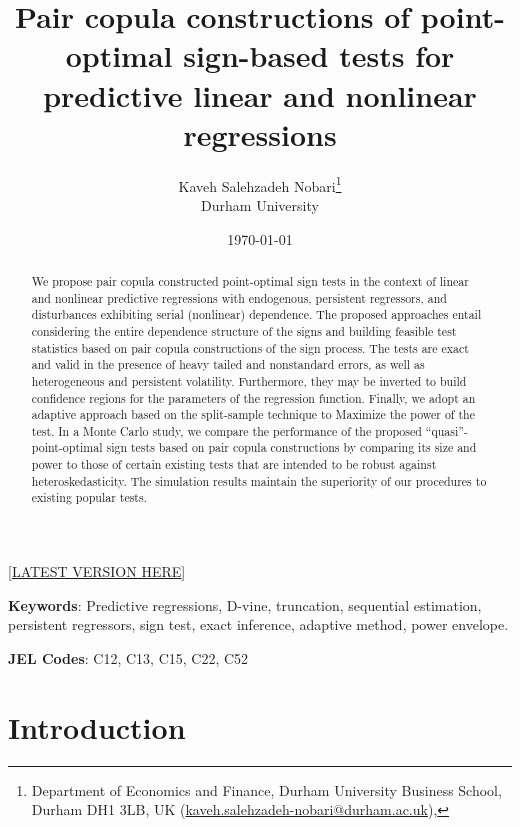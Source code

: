 \documentclass[harvard,11pt]{article}
\begin{document}
\title{{Pair copula constructions of point-optimal sign-based tests for predictive linear and nonlinear regressions}}
\author{Kaveh Salehzadeh Nobari\thanks{%
Department of Economics and Finance, Durham University Business School, Durham DH1 3LB, UK
(\href{emailto: kaveh.salehzadeh-nobari@durham.ac.uk}{kaveh.salehzadeh-nobari@durham.ac.uk}),}
\\Durham University}
\date{\today}
\maketitle
\begin{center}
[\href{https://kavehsn.github.io/Job-Market-Paper/PCC_POS_2020.pdf}{\underline{LATEST VERSION HERE}}]
\end{center}


\begin{abstract}
We propose pair copula constructed point-optimal sign tests in the context of linear and nonlinear predictive regressions with endogenous, persistent regressors, and disturbances exhibiting serial (nonlinear) dependence. The proposed approaches entail considering the entire dependence structure of the signs and building feasible test statistics based on pair copula constructions of the sign process. The tests are exact and valid in the presence of heavy tailed and nonstandard errors, as well as heterogeneous and persistent volatility. Furthermore, they may be inverted to build confidence regions for the parameters of the regression function. Finally, we adopt an adaptive approach based on the split-sample technique to Maximize the power of the test. In a Monte Carlo study, we compare the performance of the proposed \textquotedblleft quasi\textquotedblright-point-optimal sign tests based on pair copula constructions by comparing its size and power to those of certain existing tests that are intended to be robust against heteroskedasticity. The simulation results maintain the superiority of our procedures to existing popular tests.   
\end{abstract}


\noindent \textbf{Keywords}: Predictive regressions, D-vine, truncation, sequential estimation, persistent regressors, sign test, exact inference, adaptive method, power envelope.

\noindent \textbf{JEL Codes}: C12, C13, C15, C22, C52

\newpage
\section{Introduction \label{Introduction}}
\end{document}
